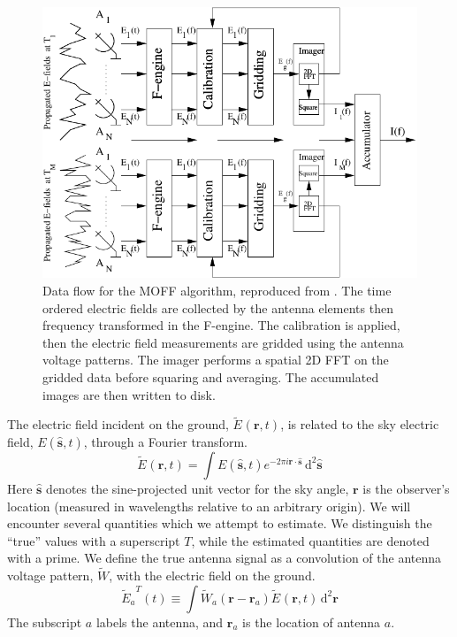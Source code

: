 \documentclass[a4paper,fleqn,usenatbib]{../mnras}
\newcommand{\ra}{\ensuremath{\mathbf{r}_a}}
\newcommand{\beamr}{\ensuremath{\widetilde{W}}}
\newcommand{\Er}[1]{\ensuremath{\widetilde{E}_{#1}}}
\newcommand{\dif}{\mathrm{d}}
\begin{document}
\begin{figure}
\begin{center}
\includegraphics[width=\columnwidth]{figures/MOFF_flowchart.pdf}
\caption{Data flow for the MOFF algorithm, reproduced from \citealt{thy15c}. The time ordered electric fields are collected by the antenna elements then frequency transformed in the F-engine. The calibration is applied, then the electric field measurements are gridded using the antenna voltage patterns. The imager performs a spatial 2D FFT on the gridded data before squaring and averaging. The accumulated images are then written to disk.}
\label{fig:moff_flow}
\end{center}
\end{figure}

The electric field incident on the ground, $\Er{}(\mathbf{r},t)$, is related to the sky electric field, $E(\hat{\mathbf{s}},t)$, through a Fourier transform.
\begin{equation}
\Er{}(\mathbf{r},t) = \int E(\hat{\mathbf{s}},t) e^{-2\pi i \mathbf{r}\cdot \hat{\mathbf{s}}}\, \dif^2 \hat{\mathbf{s}}
\end{equation}
Here $\hat{\mathbf{s}}$ denotes the sine-projected unit vector for the sky angle, $\mathbf{r}$ is the observer's location (measured in wavelengths relative to an arbitrary origin). We will encounter several quantities which we attempt to estimate. We distinguish the ``true'' values with a superscript $T$, while the estimated quantities are denoted with a prime. We define the true antenna signal as a convolution of the antenna voltage pattern, \beamr, with the electric field on the ground.
\begin{equation}
\Er{a}^T(t) \equiv \int \beamr_a(\mathbf{r}-\ra) \Er{}(\mathbf{r},t) \, \dif^2 \mathbf{r}
\end{equation}
The subscript $a$ labels the antenna, and $\mathbf{r}_a$ is the location of antenna $a$. 
\end{document}
